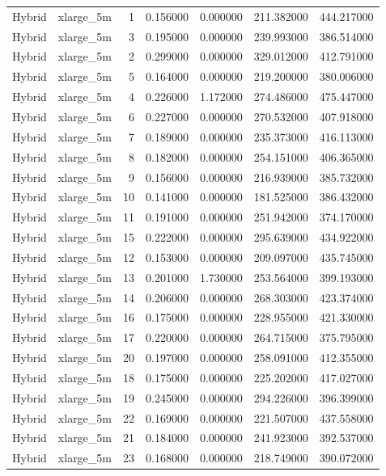 \begin{tabular}{llrrrrr}
Hybrid & xlarge_5m & 1 & 0.156000 & 0.000000 & 211.382000 & 444.217000 \\
Hybrid & xlarge_5m & 3 & 0.195000 & 0.000000 & 239.993000 & 386.514000 \\
Hybrid & xlarge_5m & 2 & 0.299000 & 0.000000 & 329.012000 & 412.791000 \\
Hybrid & xlarge_5m & 5 & 0.164000 & 0.000000 & 219.200000 & 380.006000 \\
Hybrid & xlarge_5m & 4 & 0.226000 & 1.172000 & 274.486000 & 475.447000 \\
Hybrid & xlarge_5m & 6 & 0.227000 & 0.000000 & 270.532000 & 407.918000 \\
Hybrid & xlarge_5m & 7 & 0.189000 & 0.000000 & 235.373000 & 416.113000 \\
Hybrid & xlarge_5m & 8 & 0.182000 & 0.000000 & 254.151000 & 406.365000 \\
Hybrid & xlarge_5m & 9 & 0.156000 & 0.000000 & 216.939000 & 385.732000 \\
Hybrid & xlarge_5m & 10 & 0.141000 & 0.000000 & 181.525000 & 386.432000 \\
Hybrid & xlarge_5m & 11 & 0.191000 & 0.000000 & 251.942000 & 374.170000 \\
Hybrid & xlarge_5m & 15 & 0.222000 & 0.000000 & 295.639000 & 434.922000 \\
Hybrid & xlarge_5m & 12 & 0.153000 & 0.000000 & 209.097000 & 435.745000 \\
Hybrid & xlarge_5m & 13 & 0.201000 & 1.730000 & 253.564000 & 399.193000 \\
Hybrid & xlarge_5m & 14 & 0.206000 & 0.000000 & 268.303000 & 423.374000 \\
Hybrid & xlarge_5m & 16 & 0.175000 & 0.000000 & 228.955000 & 421.330000 \\
Hybrid & xlarge_5m & 17 & 0.220000 & 0.000000 & 264.715000 & 375.795000 \\
Hybrid & xlarge_5m & 20 & 0.197000 & 0.000000 & 258.091000 & 412.355000 \\
Hybrid & xlarge_5m & 18 & 0.175000 & 0.000000 & 225.202000 & 417.027000 \\
Hybrid & xlarge_5m & 19 & 0.245000 & 0.000000 & 294.226000 & 396.399000 \\
Hybrid & xlarge_5m & 22 & 0.169000 & 0.000000 & 221.507000 & 437.558000 \\
Hybrid & xlarge_5m & 21 & 0.184000 & 0.000000 & 241.923000 & 392.537000 \\
Hybrid & xlarge_5m & 23 & 0.168000 & 0.000000 & 218.749000 & 390.072000 \\

\end{tabular}
